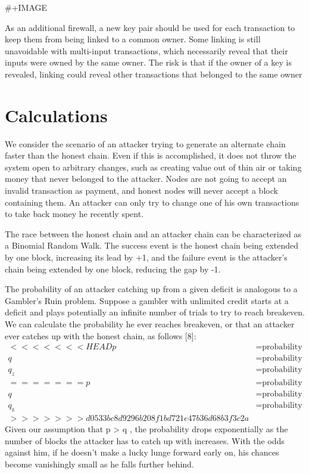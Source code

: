 \documentclass[11pt]{article}
\begin{document}
\#+IMAGE

As an additional firewall, a new key pair should be used for each transaction to keep them from being linked to a common owner.
Some linking is still unavoidable with multi-input transactions, which necessarily reveal that their inputs were owned by the same owner.
The risk is that if the owner of a key is revealed, linking could reveal other transactions that belonged to the same owner

\section{Calculations}
\label{sec:org3834c52}
We consider the scenario of an attacker trying to generate an alternate chain faster than the honest chain.
Even if this is accomplished, it does not throw the system open to arbitrary changes, such as creating value out of thin air or taking money that never belonged to the attacker.
Nodes are not going to accept an invalid transaction as payment, and honest nodes will never accept a block containing them.
An attacker can only try to change one of his own transactions to take back money he recently spent.

The race between the honest chain and an attacker chain can be characterized as a Binomial Random Walk.
The success event is the honest chain being extended by one block, increasing its lead by +1, and the failure event is the attacker's chain being extended by one block, reducing the gap by -1.

The probability of an attacker catching up from a given deficit is analogous to a Gambler's Ruin problem.
Suppose a gambler with unlimited credit starts at a deficit and plays potentially an infinite number of trials to try to reach breakeven.
We can calculate the probability he ever reaches breakeven, or that an attacker ever catches up with the honest chain, as follows [8]:
\begin{align*}
<<<<<<< HEAD
p &= \text{probability an honest node finds the next block} \\
q &= \text{probability the attacker finds the next block} \\
q_z &= \text{probability the attacker will ever catch up from z blocks behind} \\
=======
    p &= \text{probability an honest node finds the next block} \\
    q &= \text{probability the attacker finds the next block} \\
    q_{\text{z}} &= \text{probability the attacker will ever catch up from z blocks behind} \\
>>>>>>> d0533bc8d9296b208f1bd721e47b36d68b3f3c2a
\end{align*}
Given our assumption that p > q , the probability drops exponentially as the number of blocks the attacker has to catch up with increases.
With the odds against him, if he doesn't make a lucky lunge forward early on, his chances become vanishingly small as he falls further behind.
\end{document}
